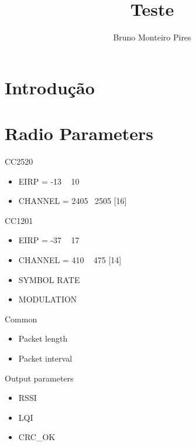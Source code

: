 \documentclass{article}
\begin{document}
\title{Teste}
\author{Bruno Monteiro Pires}
\maketitle
\clearpage

\section{Introdução}



\section{Radio Parameters}
CC2520
\begin{itemize}
\item EIRP = -13 ~ 10
\item CHANNEL = 2405 ~2505 [16]
\end{itemize}
CC1201
\begin{itemize}
\item EIRP = -37 ~ 17
\item CHANNEL = 410 ~ 475 [14]
\item SYMBOL RATE
\item MODULATION
\end{itemize}
Common
\begin{itemize}
\item Packet length
\item Packet interval
\end{itemize}
Output parameters
\begin{itemize}
\item RSSI
\item LQI
\item CRC\_OK
\end{itemize}
\end{document}
